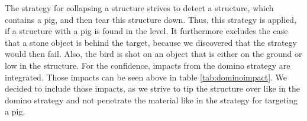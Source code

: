 The strategy for collapsing a structure strives to detect a structure, which contains a pig, and then tear this structure down. Thus, this strategy is applied, if a structure with a pig is found in the level. It furthermore excludes the case that a stone object is behind the target, because we discovered that the strategy would then fail. Also, the bird is shot on an object that is either on the ground or low in the structure. For the confidence, impacts from the domino strategy are integrated. Those impacts can be seen above in table \ref{tab:dominoimpact}. We decided to include those impacts, as we strive to tip the structure over like in the domino strategy and not penetrate the material like in the strategy for targeting a pig.